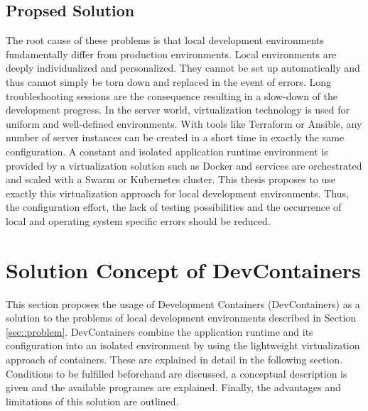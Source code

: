 \documentclass[12pt, a4paper]{article}
\begin{document}
        \subsection{Propsed Solution}
        The root cause of these problems is that local development environments fundamentally differ from production environments. Local environments are deeply individualized and personalized. They cannot be set up automatically and thus cannot simply be torn down and replaced in the event of errors. Long troubleshooting sessions are the consequence resulting in a slow-down of the development progress.\newline
        In the server world, virtualization technology is used for uniform and well-defined environments. With tools like Terraform or Ansible, any number of server instances can be created in a short time in exactly the same configuration. A constant and isolated application runtime environment is provided by a virtualization solution such as Docker and services are orchestrated and scaled with a Swarm or Kubernetes cluster.\newline
        This thesis proposes to use exactly this virtualization approach for local development environments. Thus, the configuration effort, the lack of testing possibilities and the occurrence of local and operating system specific errors should be reduced.

\section{Solution Concept of DevContainers}\label{sec::solution_concept}
This section proposes the usage of Development Containers (DevContainers) as a solution to the problems of local development environments described in Section \ref{sec::problem}. DevContainers combine the application runtime and its configuration into an isolated environment by using the lightweight virtualization approach of containers. These are explained in detail in the following section. Conditions to be fulfilled beforehand are discussed, a conceptual description is given and the available programes are explained. Finally, the advantages and limitations of this solution are outlined.
\end{document}
